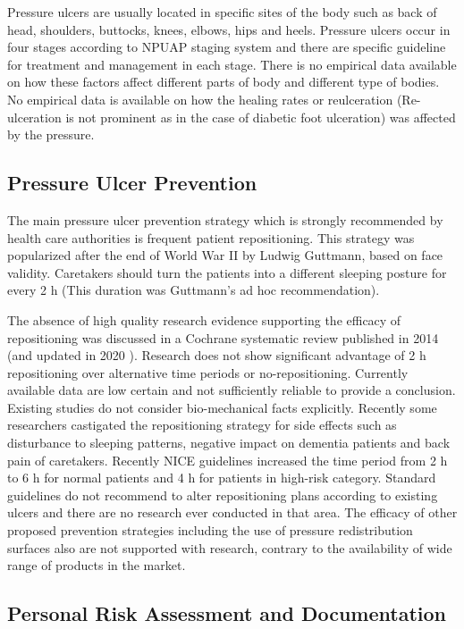Pressure ulcers are usually located in specific sites of the body such as back of head, shoulders, buttocks,  knees, elbows, hips and heels.  Pressure ulcers occur in four stages according to NPUAP staging system and there are specific guideline for treatment and management in each stage.\cite{npuapguide} There is no empirical data available on how these factors affect different parts of body and different type of bodies. No empirical data is available on how the healing rates or reulceration (Re-ulceration is not prominent as in the case of diabetic foot ulceration) was affected by the pressure. 

\subsection{Pressure Ulcer Prevention}
The main pressure ulcer prevention strategy which is strongly recommended by health care authorities is frequent patient repositioning. This strategy was popularized after the end of World War II by Ludwig Guttmann, based on face validity. \cite{biomechanics} Caretakers should turn the patients into a different sleeping posture for every 2 h (This duration was Guttmann's ad hoc recommendation).

The absence of high quality research evidence supporting the efficacy of repositioning was discussed in a Cochrane systematic review published in 2014  \cite{cochrane14} (and updated in 2020  \cite{cochrane20}). Research does not show significant advantage of 2 h repositioning over alternative time periods or no-repositioning. Currently available data are low certain and not sufficiently reliable to provide a conclusion. Existing studies do not consider bio-mechanical facts explicitly. Recently some researchers castigated the repositioning strategy for side effects such as disturbance to sleeping patterns, negative impact on dementia patients and back pain of caretakers.\cite{elderabuse} Recently NICE guidelines increased the time period from 2 h to 6 h for normal patients and 4 h for patients in high-risk category. \cite{sara} Standard guidelines do not recommend to alter repositioning plans according to existing ulcers and there are no research ever conducted in that area. The efficacy of other proposed prevention strategies including the use of pressure redistribution surfaces also are not supported with research, contrary to the availability of wide range of products in the market. \cite{cochranesupport}

\subsection{Personal Risk Assessment and Documentation}

